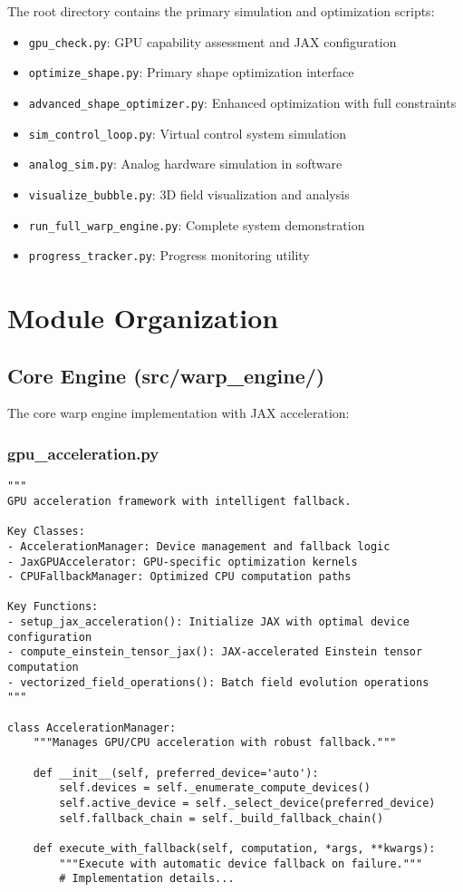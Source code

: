 \documentclass{article}
\begin{document}
The root directory contains the primary simulation and optimization scripts:

\begin{itemize}
\item \texttt{gpu\_check.py}: GPU capability assessment and JAX configuration
\item \texttt{optimize\_shape.py}: Primary shape optimization interface
\item \texttt{advanced\_shape\_optimizer.py}: Enhanced optimization with full constraints
\item \texttt{sim\_control\_loop.py}: Virtual control system simulation
\item \texttt{analog\_sim.py}: Analog hardware simulation in software
\item \texttt{visualize\_bubble.py}: 3D field visualization and analysis
\item \texttt{run\_full\_warp\_engine.py}: Complete system demonstration
\item \texttt{progress\_tracker.py}: Progress monitoring utility
\end{itemize}

\section{Module Organization}

\subsection{Core Engine (src/warp\_engine/)}

The core warp engine implementation with JAX acceleration:

\subsubsection{gpu\_acceleration.py}
\begin{lstlisting}
"""
GPU acceleration framework with intelligent fallback.

Key Classes:
- AccelerationManager: Device management and fallback logic
- JaxGPUAccelerator: GPU-specific optimization kernels
- CPUFallbackManager: Optimized CPU computation paths

Key Functions:
- setup_jax_acceleration(): Initialize JAX with optimal device configuration
- compute_einstein_tensor_jax(): JAX-accelerated Einstein tensor computation
- vectorized_field_operations(): Batch field evolution operations
"""

class AccelerationManager:
    """Manages GPU/CPU acceleration with robust fallback."""
    
    def __init__(self, preferred_device='auto'):
        self.devices = self._enumerate_compute_devices()
        self.active_device = self._select_device(preferred_device)
        self.fallback_chain = self._build_fallback_chain()
    
    def execute_with_fallback(self, computation, *args, **kwargs):
        """Execute with automatic device fallback on failure."""
        # Implementation details...
\end{lstlisting}
\end{document}
